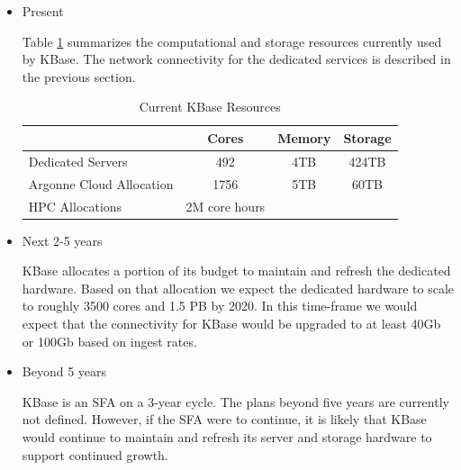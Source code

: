 \documentclass[10pt,a4paper]{report}
\begin{document}
\begin{itemize}
\item Present

Table \ref{table:kbase-resources} summarizes the computational and storage resources currently used by KBase.  The network connectivity for the dedicated services is described in the previous section.

\begin{table}[htdp]
\caption{Current KBase Resources}
\begin{center}
\begin{tabular}{| l | c | c | c |}
\hline
 & Cores & Memory & Storage \\ \hline
Dedicated Servers & 492  & 4TB & 424TB \\
Argonne Cloud Allocation & 1756 & 5TB & 60TB \\
HPC Allocations & 2M core hours & & \\ \hline
\end{tabular}
\end{center}
\label{table:kbase-resources}
\end{table}

\item Next 2-5 years

KBase allocates a portion of its budget to maintain and refresh the dedicated hardware.  Based on that allocation we expect the dedicated hardware to scale to roughly 3500 cores and 1.5 PB by 2020.  In this time-frame we would expect that the connectivity for KBase would be upgraded to at least 40Gb or 100Gb based on ingest rates.

\item Beyond 5 years

KBase is an SFA on a 3-year cycle.  The plans beyond five years are currently not defined.  However, if the SFA were to continue, it is likely that KBase would continue to maintain and refresh its server and storage hardware to support continued growth.

\end{itemize}
\end{document}
